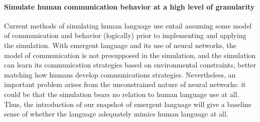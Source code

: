 \paragraph{Simulate human communication behavior at a high level of granularity}
Current methods of simulating human language use entail assuming some model of communication and behavior (logically) prior to implementing and applying the simulation.
With emergent language and its use of neural networks, the model of communication is not presupposed in the simulation, and the simulation can learn its communication strategies based on environmental constraints, better matching how humans develop communications strategies.
Nevertheless, an important problem arises from the unconstrained nature of neural networks: it could be that the simulation bears no relation to human language use at all.
Thus, the introduction of our snapshot of emergent language will give a baseline sense of whether the language adequately mimics human language at all.

